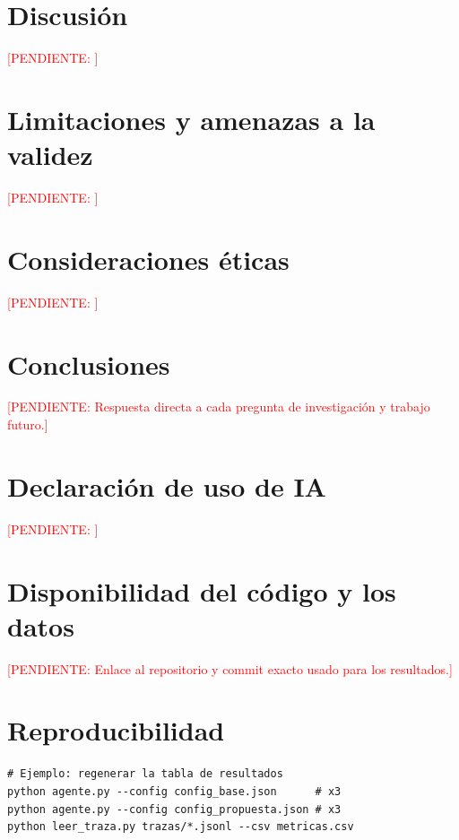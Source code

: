 \documentclass[10pt,twocolumn,a4paper]{article}
\newcommand{\todo}[1]{\textcolor{red}{[PENDIENTE: #1]}}
\begin{document}
\section{Discusión}
\todo{}

\section{Limitaciones y amenazas a la validez}
\todo{}

\section{Consideraciones éticas}
\todo{}

\section{Conclusiones}
\todo{Respuesta directa a cada pregunta de investigación y trabajo futuro.}

\section*{Declaración de uso de IA}
\todo{}

\section*{Disponibilidad del código y los datos}
\todo{Enlace al repositorio y commit exacto usado para los resultados.}




\appendix
\section{Reproducibilidad}
\begin{lstlisting}
# Ejemplo: regenerar la tabla de resultados
python agente.py --config config_base.json      # x3
python agente.py --config config_propuesta.json # x3
python leer_traza.py trazas/*.jsonl --csv metricas.csv
\end{lstlisting}
\end{document}

